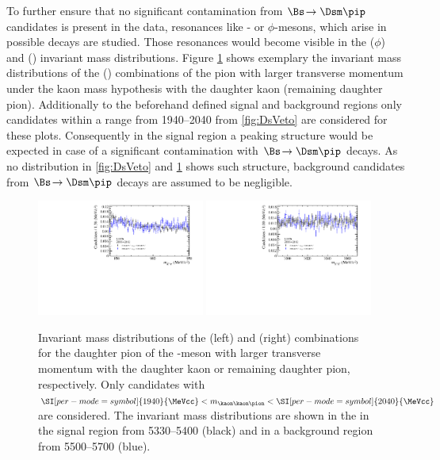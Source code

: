 To further ensure that no significant contamination from $\Bs\!\to\Dsm\pip$ candidates is present in the data, resonances like \Kstarz- or $\phi$-mesons, which arise in possible \Dsm decays are studied.
Those resonances would become visible in the \kaon\kaon ($\phi$) and \kaon\pion (\Kstarz) invariant mass distributions.
Figure \ref{fig:phi_Kst_veto} shows exemplary the invariant mass distributions of the \kaon\kaon (\kaon\pion) combinations of the pion with larger transverse momentum under the kaon mass hypothesis with the daughter kaon (remaining daughter pion).
Additionally to the beforehand defined signal and background regions only candidates within a range from \SIrange[per-mode=symbol]{1940}{2040}{\MeVcc} from \cref{fig:DsVeto} are considered for these plots.
Consequently in the signal region a peaking structure would be expected in case of a significant contamination with $\Bs\!\to\Dsm\pip$ decays.
As no distribution in \cref{fig:DsVeto} and \cref{fig:phi_Kst_veto} shows such structure, background candidates from $\Bs\!\to\Dsm\pip$ decays are assumed to be negligible.
\begin{figure}[tbp]
    \centering
    \includegraphics[width=0.49\textwidth]{06selection/figs/KstarHypo2.pdf}
    \includegraphics[width=0.49\textwidth]{06selection/figs/PhiHypo2.pdf}
    \caption{Invariant mass distributions of the \kaon\pion (left) and \kaon\kaon (right) combinations for the daughter pion of the \Dm-meson with larger transverse momentum with the daughter kaon or remaining daughter pion, respectively.
    Only candidates with $\SI[per-mode=symbol]{1940}{\MeVcc}<m_{\kaon\kaon\pion}<\SI[per-mode=symbol]{2040}{\MeVcc}$ are considered.
    The invariant mass distributions are shown in the in the \Bs signal region from \SIrange[per-mode=symbol]{5330}{5400}{\MeVcc} (black) and in a background region from \SIrange[per-mode=symbol]{5500}{5700}{\MeVcc} (blue).}
    \label{fig:phi_Kst_veto}
\end{figure}


